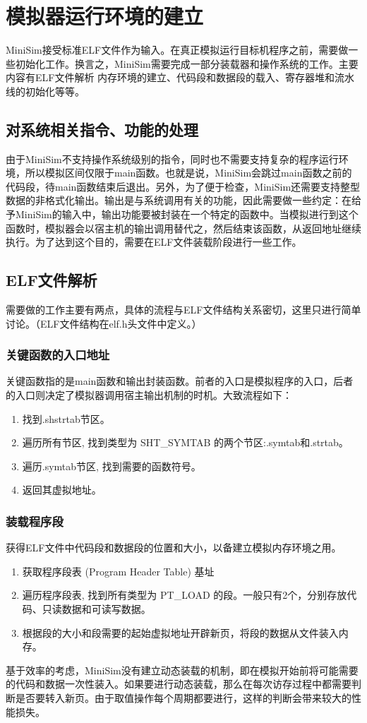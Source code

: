 \documentclass[12pt,a4paper,Flow]{report}
\begin{document}
\chapter{模拟器运行环境的建立}
MiniSim接受标准ELF文件作为输入。在真正模拟运行目标机程序之前，需要做一些初始化工作。换言之，MiniSim需要完成一部分装载器和操作系统的工作。主要内容有ELF文件解析
内存环境的建立、代码段和数据段的载入、寄存器堆和流水线的初始化等等。
\section{对系统相关指令、功能的处理}
由于MiniSim不支持操作系统级别的指令，同时也不需要支持复杂的程序运行环境，所以模拟区间仅限于main函数。也就是说，MiniSim会跳过main函数之前的代码段，待main函数结束后退出。另外，为了便于检查，MiniSim还需要支持整型数据的非格式化输出。输出是与系统调用有关的功能，因此需要做一些约定：在给予MiniSim的输入中，输出功能要被封装在一个特定的函数中。当模拟进行到这个函数时，模拟器会以宿主机的输出调用替代之，然后结束该函数，从返回地址继续执行。为了达到这个目的，需要在ELF文件装载阶段进行一些工作。
\section{ELF文件解析}
需要做的工作主要有两点，具体的流程与ELF文件结构关系密切，这里只进行简单讨论。（ELF文件结构在elf.h头文件中定义。）
\subsection{关键函数的入口地址}
关键函数指的是main函数和输出封装函数。前者的入口是模拟程序的入口，后者的入口则决定了模拟器调用宿主输出机制的时机。大致流程如下：
\begin{enumerate}
\item 找到.shstrtab节区。
\item 遍历所有节区, 找到类型为 SHT\_SYMTAB 的两个节区:.symtab和.strtab。
\item 遍历.symtab节区, 找到需要的函数符号。
\item 返回其虚拟地址。
\end{enumerate}
\subsection{装载程序段}
获得ELF文件中代码段和数据段的位置和大小，以备建立模拟内存环境之用。
\begin{enumerate}
\item 获取程序段表 (Program Header Table) 基址
\item 遍历程序段表, 找到所有类型为 PT\_LOAD 的段。一般只有2个，分别存放代码、只读数据和可读写数据。
\item 根据段的大小和段需要的起始虚拟地址开辟新页，将段的数据从文件装入内存。
\end{enumerate}
基于效率的考虑，MiniSim没有建立动态装载的机制，即在模拟开始前将可能需要的代码和数据一次性装入。如果要进行动态装载，那么在每次访存过程中都需要判断是否要转入新页。由于取值操作每个周期都要进行，这样的判断会带来较大的性能损失。
\end{document}
